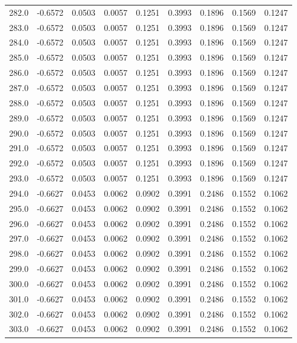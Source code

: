\begin{longtable}{lrrrrrrrr}
282.0 & -0.6572 & 0.0503 & 0.0057 & 0.1251 & 0.3993 & 0.1896 & 0.1569 & 0.1247 \\
283.0 & -0.6572 & 0.0503 & 0.0057 & 0.1251 & 0.3993 & 0.1896 & 0.1569 & 0.1247 \\
284.0 & -0.6572 & 0.0503 & 0.0057 & 0.1251 & 0.3993 & 0.1896 & 0.1569 & 0.1247 \\
285.0 & -0.6572 & 0.0503 & 0.0057 & 0.1251 & 0.3993 & 0.1896 & 0.1569 & 0.1247 \\
286.0 & -0.6572 & 0.0503 & 0.0057 & 0.1251 & 0.3993 & 0.1896 & 0.1569 & 0.1247 \\
287.0 & -0.6572 & 0.0503 & 0.0057 & 0.1251 & 0.3993 & 0.1896 & 0.1569 & 0.1247 \\
288.0 & -0.6572 & 0.0503 & 0.0057 & 0.1251 & 0.3993 & 0.1896 & 0.1569 & 0.1247 \\
289.0 & -0.6572 & 0.0503 & 0.0057 & 0.1251 & 0.3993 & 0.1896 & 0.1569 & 0.1247 \\
290.0 & -0.6572 & 0.0503 & 0.0057 & 0.1251 & 0.3993 & 0.1896 & 0.1569 & 0.1247 \\
291.0 & -0.6572 & 0.0503 & 0.0057 & 0.1251 & 0.3993 & 0.1896 & 0.1569 & 0.1247 \\
292.0 & -0.6572 & 0.0503 & 0.0057 & 0.1251 & 0.3993 & 0.1896 & 0.1569 & 0.1247 \\
293.0 & -0.6572 & 0.0503 & 0.0057 & 0.1251 & 0.3993 & 0.1896 & 0.1569 & 0.1247 \\
294.0 & -0.6627 & 0.0453 & 0.0062 & 0.0902 & 0.3991 & 0.2486 & 0.1552 & 0.1062 \\
295.0 & -0.6627 & 0.0453 & 0.0062 & 0.0902 & 0.3991 & 0.2486 & 0.1552 & 0.1062 \\
296.0 & -0.6627 & 0.0453 & 0.0062 & 0.0902 & 0.3991 & 0.2486 & 0.1552 & 0.1062 \\
297.0 & -0.6627 & 0.0453 & 0.0062 & 0.0902 & 0.3991 & 0.2486 & 0.1552 & 0.1062 \\
298.0 & -0.6627 & 0.0453 & 0.0062 & 0.0902 & 0.3991 & 0.2486 & 0.1552 & 0.1062 \\
299.0 & -0.6627 & 0.0453 & 0.0062 & 0.0902 & 0.3991 & 0.2486 & 0.1552 & 0.1062 \\
300.0 & -0.6627 & 0.0453 & 0.0062 & 0.0902 & 0.3991 & 0.2486 & 0.1552 & 0.1062 \\
301.0 & -0.6627 & 0.0453 & 0.0062 & 0.0902 & 0.3991 & 0.2486 & 0.1552 & 0.1062 \\
302.0 & -0.6627 & 0.0453 & 0.0062 & 0.0902 & 0.3991 & 0.2486 & 0.1552 & 0.1062 \\
303.0 & -0.6627 & 0.0453 & 0.0062 & 0.0902 & 0.3991 & 0.2486 & 0.1552 & 0.1062 \\

\end{longtable}

